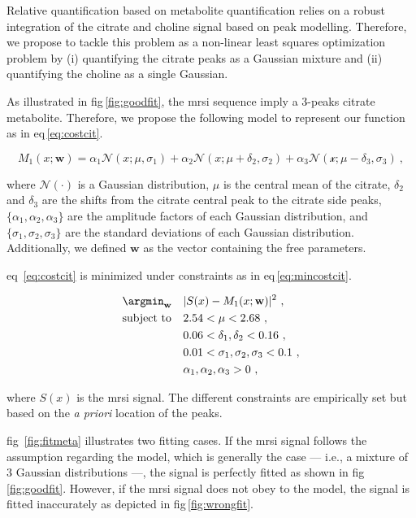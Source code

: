 Relative quantification based on metabolite quantification relies on a robust integration of the citrate and choline signal based on peak modelling.
Therefore, we propose to tackle this problem as a non-linear least squares optimization problem by (i) quantifying the citrate peaks as a Gaussian mixture and (ii) quantifying the choline as a single Gaussian.

As illustrated in \acs{fig}\,\ref{fig:goodfit}, the \ac{mrsi} sequence imply a 3-peaks citrate metabolite.
Therefore, we propose the following model to represent our function as in \acs{eq}\,\eqref{eq:costcit}.

\begin{equation}
  M_1(x; \mathbf{w}) = \alpha_1 \mathcal{N}(x; \mu, \sigma_1) + \alpha_2 \mathcal{N}(x; \mu + \delta_2, \sigma_2) + \alpha_3 \mathcal{N(x; \mu - \delta_3, \sigma_3)} \ ,
  \label{eq:costcit}
\end{equation}

\noindent where $\mathcal{N}(\cdot)$ is a Gaussian distribution, $\mu$ is the central mean of the citrate, $\delta_2$ and $\delta_3$ are the shifts from the citrate central peak to the citrate side peaks, $\{\alpha_1, \alpha_2, \alpha_3\}$ are the amplitude factors of each Gaussian distribution, and $\{\sigma_1, \sigma_2, \sigma_3\}$ are the standard deviations of each Gaussian distribution. Additionally, we defined $\mathbf{w}$ as the vector containing the free parameters.

\Acl{eq}~\eqref{eq:costcit} is minimized under constraints as in \acs{eq}\,\eqref{eq:mincostcit}.


\begin{equation}
\begin{aligned}
& \argmin_{\mathbf{w}} 
& & | S(x) - M_1(x; \mathbf{w}) |^{2} \ , \label{eq:mincostcit} \\
& \text{subject to}
& & 2.54 < \mu < 2.68 \ , \\
&&& 0.06 < \delta_1, \delta_2 < 0.16 \ , \\
&&& 0.01 < \sigma_1, \sigma_2, \sigma_3 < 0.1 \ , \\
&&& \alpha_1, \alpha_2, \alpha_3 > 0 \ ,
\end{aligned}
\end{equation}

\noindent where $S(x)$ is the \ac{mrsi} signal. The different constraints are empirically set but based on the \emph{a priori} location of the peaks.

\Acl{fig}~\ref{fig:fitmeta} illustrates two fitting cases.
If the \ac{mrsi} signal follows the assumption regarding the model, which is generally the case --- i.e., a mixture of 3 Gaussian distributions ---, the signal is perfectly fitted as shown in \acs{fig}\,\ref{fig:goodfit}.
However, if the \ac{mrsi} signal does not obey to the model, the signal is fitted inaccurately as depicted in \acs{fig}\,\ref{fig:wrongfit}.

